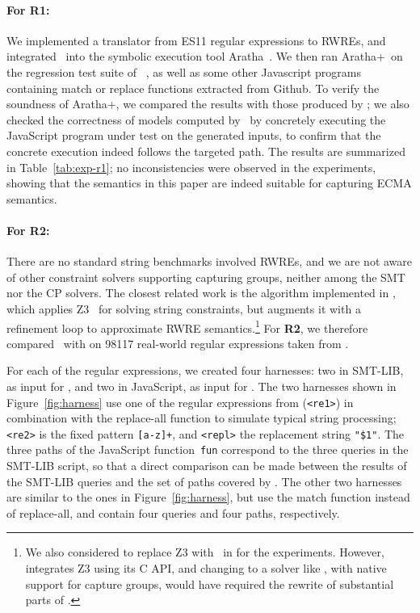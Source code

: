 \paragraph{For \textbf{R1}:} We implemented a translator from ES11 regular
expressions to RWREs, and integrated \ostrich\ into the symbolic
execution tool Aratha~\cite{aratha}. We then ran Aratha+\ostrich\ on
the regression test suite of \expose{}~\cite{DBLP:conf/spin/LoringMK17},
as well as some other Javascript programs containing match or replace
functions extracted from Github. To verify the soundness of
Aratha+\ostrich, we compared the results with those produced by
\expose{}; we also checked the correctness of models computed by
\ostrich\ by concretely executing the JavaScript program under test on
the generated inputs, to confirm that the concrete execution indeed
follows the targeted path.  The results are summarized in Table~\ref{tab:exp-r1};
no inconsistencies were observed in the experiments, showing that the
semantics in this paper are indeed suitable for capturing ECMA
semantics.

\paragraph{For \textbf{R2}:} There are no standard string benchmarks
involved RWREs, and we are not aware of other constraint solvers
supporting capturing groups, neither among the SMT nor the CP
solvers. %
The closest related work is the algorithm implemented in \expose{}, which
applies Z3~\cite{Z3} for solving string constraints, but augments
it with a refinement loop to approximate RWRE
semantics.\footnote{We also considered to replace Z3 with \ostrich\ in
  \expose{} for the experiments. However, \expose{} integrates Z3 using its
  C API, and changing to a solver like \ostrich, with native support
  for capture groups, would have required the rewrite of substantial
  parts of \expose{}.}
%
For \textbf{R2}, we therefore compared \ostrich\ with \expose{} on 98117
real-world regular expressions taken from \cite{DMC+19}.

For each of the regular expressions, we created four harnesses: two in
SMT-LIB, as input for \ostrich, and two in JavaScript, as input for
\expose{}. The two harnesses shown in Figure~\ref{fig:harness} use one of the
regular expressions from \cite{DMC+19} (\verb!<re1>!) in combination with
the replace-all function to simulate typical string processing;
\verb!<re2>! is the fixed pattern \verb![a-z]+!, and \verb!<repl>! the
replacement string \verb!"$1"!. The three paths of the JavaScript
function~\verb!fun! correspond to the three queries in the SMT-LIB
script, so that a direct comparison can be made between the results of
the SMT-LIB queries and the set of paths covered by \expose{}. The other
two harnesses are similar to the ones in Figure~\ref{fig:harness}, but
use the match function instead of replace-all, and contain four
queries and four paths, respectively.


